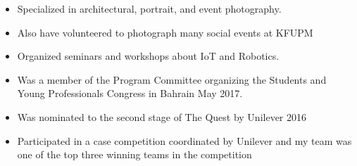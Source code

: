 \documentclass[10pt,a4paper]{altacv}
\begin{document}









\clearpage
{}

\begin{itemize}
\item Specialized in architectural, portrait, and event photography.
\item Also have volunteered to photograph many social events at KFUPM
\end{itemize}

\divider

\begin{itemize}
\item Organized seminars and workshops about IoT and Robotics.
\item Was a member of the Program Committee organizing the Students and Young Professionals Congress in Bahrain May 2017.
\end{itemize}

\divider

\begin{itemize}
\item Was nominated to the second stage of The Quest by Unilever 2016 
\item Participated in a case competition coordinated by Unilever and my team was one of the top three winning teams in the competition 
\end{itemize}
\end{document}
